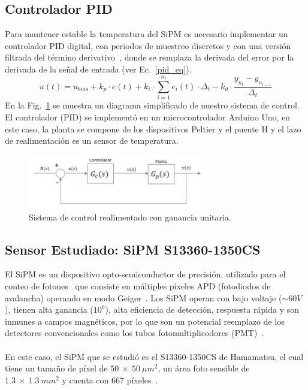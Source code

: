 \documentclass[runningheads]{llncs}
\begin{document}
\subsection{Controlador PID}
Para mantener estable la temperatura del SiPM es necesario implementar un controlador PID digital,  con periodos de muestreo discretos y con una versión filtrada del término derivativo~\cite{Astrom_control_PID}, donde se remplaza la derivada del error por la derivada de la señal de entrada (ver Ec.~\ref{pid_eq}).%
\begin{equation}
u(t)=u_{bias} + k_{p}\cdot e(t) + k_{i}\cdot \displaystyle\sum_{i=1}^{n_{t}} e_{i}(t)\cdot \Delta_{t} - k_{d}\cdot \frac{y_{n_{t}}-y_{n_{t-1}}}{\Delta_{t}}  
\label{pid_eq}
\end{equation}
En la Fig.~\ref{Diag_PID} se muestra un diagrama simplificado de nuestro sistema de control. El controlador (PID) se implementó en un microcontrolador Arduino Uno, en este caso, la planta se compone de los dispositivos Peltier y el puente H y el lazo de realimentación es un sensor de temperatura.  
\begin{figure}[ht]
\includegraphics[width=0.7\textwidth]{diagrama_control.JPG}
\centering
\caption{Sistema de control realimentado con ganancia unitaria.} 
\label{Diag_PID}
\end{figure}

\subsection{Sensor Estudiado: SiPM S13360-1350CS}
El SiPM es un dispositivo opto-semiconductor de precisión, utilizado para el conteo de fotones~\cite{Intro_SIPM_Sensl} que consiste en múltiples píxeles APD (fotodiodos de avalancha) operando en modo Geiger~\cite{Sipm_S13360_1350CS_datasheet,Apd_Hamamatsu}. Los SiPM operan con bajo voltaje ($\sim 60V$),  tienen alta ganancia ($10^{6}$), alta eficiencia de detección, respuesta rápida y son inmunes a campos magnéticos, por lo que son un potencial reemplazo de los detectores convencionales como los tubos fotomultiplicodores (PMT)~\cite{Measuring_MPPC}.\\ \\
En este caso, el SiPM que se estudió es el S13360-1350CS de Hamamatsu, el cual tiene un tamaño de píxel de $50~\times~50~\mu m^{2}$, un área foto sensible de $1.3~\times~1.3~mm^{2}$ y cuenta con 667 píxeles~\cite{Apd_Hamamatsu}. 
\end{document}
